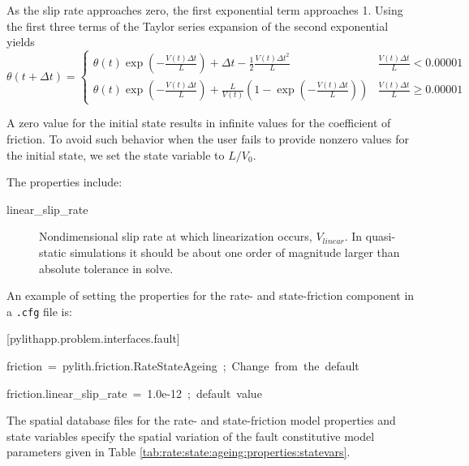 As the slip rate approaches zero, the first exponential term approaches
1. Using the first three terms of the Taylor series expansion of the
second exponential yields
\begin{equation}
\theta(t+\Delta t)=\begin{cases}
\theta(t)\exp\left(-\frac{V(t)\Delta t}{L}\right)+\Delta t-\frac{1}{2}\frac{V(t)\Delta t^{2}}{L} & \frac{V(t)\Delta t}{L}<0.00001\\
\theta(t)\exp\left(-\frac{V(t)\Delta t}{L}\right)+\frac{L}{V(t)}\left(1-\exp\left(-\frac{V(t)\Delta t}{L}\right)\right) & \frac{V(t)\Delta t}{L}\ge0.00001
\end{cases}
\end{equation}


A zero value for the initial state results in infinite values for
the coefficient of friction. To avoid such behavior when the user
fails to provide nonzero values for the initial state, we set the
state variable to $L/V_{0}$.

The properties include:
\begin{description}
\item [{linear\_slip\_rate}] Nondimensional slip rate at which linearization
occurs, $V_{linear}$. In quasi-static simulations it should be about
one order of magnitude larger than absolute tolerance in solve.
\end{description}
An example of setting the properties for the rate- and state-friction
component in a \texttt{.cfg} file is:
\begin{lyxcode}
{\footnotesize{}{[}pylithapp.problem.interfaces.fault{]}}{\footnotesize \par}

{\footnotesize{}friction~=~pylith.friction.RateStateAgeing~;~Change~from~the~default}{\footnotesize \par}

{\footnotesize{}friction.linear\_slip\_rate~=~1.0e-12~;~default~value}{\footnotesize \par}
\end{lyxcode}
The spatial database files for the rate- and state-friction model
properties and state variables specify the spatial variation of the
fault constitutive model parameters given in Table \vref{tab:rate:state:ageing:properties:statevars}.


